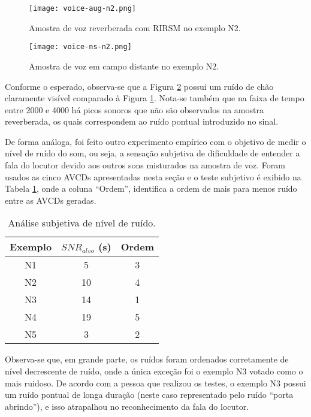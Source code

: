 \begin{figure} [H]
    \centering
    \texttt{[image: voice-aug-n2.png]}
    \caption{Amostra de voz reverberada com RIRSM no exemplo N2.}
    \label{fig:voice-aug-n2}
\end{figure} 

\begin{figure} [H]
    \centering
    \texttt{[image: voice-ns-n2.png]}
    \caption{Amostra de voz em campo distante no exemplo N2.}
    \label{fig:voice-ns-n2}
\end{figure} 

Conforme o esperado, observa-se que a Figura \ref{fig:voice-ns-n2} possui um ruído de chão claramente visível comparado à Figura \ref{fig:voice-aug-n2}.
Nota-se também que na faixa de tempo entre 2000 e 4000 há picos sonoros que não são observados na amostra reverberada, os quais correspondem ao ruído pontual
introduzido no sinal.

De forma análoga, foi feito outro experimento empírico com o objetivo de medir o nível de ruído do som, ou seja, 
a sensação subjetiva de dificuldade de entender a fala do locutor devido aos outros sons misturados na amostra de voz.
Foram usados as cinco AVCDs apresentadas nesta seção e o teste subjetivo é exibido na Tabela \ref{tbl:noise-exp}, onde
a coluna “Ordem”, identifica a ordem de mais para menos ruído entre as AVCDs geradas.

\begin{table} [H]
    \centering
    \caption{Análise subjetiva de nível de ruído.}
    \label{tbl:noise-exp}
    \begin{tabular}{c|c|c}

        \textbf{Exemplo} & 
        \textbf{$SNR_{alvo}$ (s)} & 
        \textbf{Ordem} \\
        \hline 

        N1 &  5 & 3 \\
        N2 & 10 & 4 \\
        N3 & 14 & 1 \\
        N4 & 19 & 5 \\
        N5 &  3 & 2 \\

    \end{tabular}
\end{table}

Observa-se que, em grande parte, os ruídos foram ordenados corretamente de nível decrescente de ruído, onde a única exceção foi o exemplo N3 votado como 
o mais ruidoso. De acordo com a pessoa que realizou os testes, o exemplo N3 possui um ruído pontual
de longa duração (neste caso representado pelo ruído “porta abrindo”), e isso atrapalhou no reconhecimento da fala do locutor.
